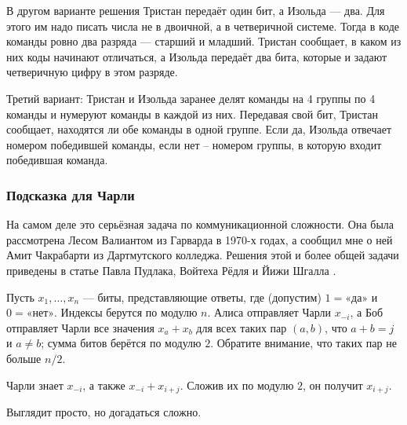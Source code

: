 \begin{addedbytheeditors}
В другом варианте решения Тристан передаёт один бит, а Изольда --- два.
Для этого им надо писать числа не в двоичной, а в четверичной системе.
Тогда в коде команды ровно два разряда --- старший и младший.
Тристан сообщает, в каком из них коды начинают отличаться, а Изольда передаёт два бита, которые и задают четверичную цифру в этом разряде.

Третий вариант: Тристан и Изольда заранее делят команды на 4 группы по 4 команды и нумеруют команды в каждой из них. Передавая свой бит, Тристан сообщает, находятся ли обе команды в одной группе. Если да, Изольда отвечает номером победившей команды, если нет -- номером группы, в которую входит победившая команда. 

\pr
%
%
\end{addedbytheeditors}

\subsubsection*{Подсказка для Чарли}

На самом деле это серьёзная задача по коммуникационной сложности.
Она была рассмотрена Лесом Валиантом из Гарварда в 1970-х годах,
а сообщил мне о ней Амит Чакрабарти из Дартмутского колледжа.
Решения этой и более общей задачи приведены в статье Павла Пудлака, Войтеха Рёдля и Йижи Шгалла \cite{49}.

Пусть $x_1, \dots , x_n$ --- биты, представляющие ответы, где (допустим) $1 = \text{«да»}$ и $0 = \text{«нет»}$.
Индексы берутся по модулю $n$.
Алиса отправляет Чарли $x_{-i}$,
а Боб отправляет Чарли все значения $x_a + x_b$ для всех таких пар $(a, b)$, что $a + b = j$ и $a\ne b$;
сумма битов берётся по модулю $2$.
Обратите внимание, что таких пар не больше $n/2$.

Чарли знает $x_{-i}$, а также $x_{-i} + x_{i+j}$. Сложив их по модулю $2$, он получит $x_{i+j}$.

Выглядит просто, но догадаться сложно.

